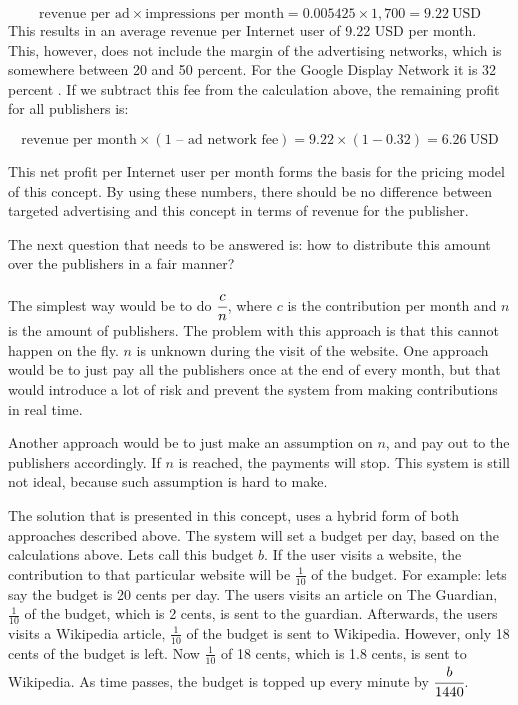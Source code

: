 \begin{equation}
  \text{revenue per ad} \times \text{impressions per month} = 0.005425 \times 1,700 = 9.22 ~\text{USD}
\end{equation}
This results in an average revenue per Internet user of 9.22 USD per month. This, however, does not include the margin of the advertising networks, which is somewhere between 20 and 50 percent. For the Google Display Network it is 32 percent \cite{googlefee}. If we subtract this fee from the calculation above, the remaining profit for all publishers is:


\begin{equation}
  \text{revenue per month} \times (\text{1 -- ad network fee}) = 9.22 \times (1 - 0.32) = 6.26 ~\text{USD}
\end{equation}


This net profit per Internet user per month forms the basis for the pricing model of this concept. By using these numbers, there should be no difference between targeted advertising and this concept in terms of revenue for the publisher.

The next question that needs to be answered is: how to distribute this amount over the publishers in a fair manner?  

The simplest way would be to do $\cfrac{c}{n}$, where $c$ is the contribution per month and $n$ is the amount of publishers. The problem with this approach is that this cannot happen on the fly. $n$ is unknown during the visit of the website. One approach would be to just pay all the publishers once at the end of every month, but that would introduce a lot of risk and prevent the system from making contributions in real time. 

Another approach would be to just make an assumption on $n$, and pay out to the publishers accordingly. If $n$ is reached, the payments will stop. This system is still not ideal, because such assumption is hard to make.

The solution that is presented in this concept, uses a hybrid form of both approaches described above. The system will set a budget per day, based on the calculations above. Lets call this budget $b$. If the user visits a website, the contribution to that particular website will be $\frac{1}{10}$ of the budget. For example: lets say the budget is 20 cents per day. The users visits an article on The Guardian, $\frac{1}{10}$ of the budget, which is 2 cents, is sent to the guardian. Afterwards, the users visits a Wikipedia article, $\frac{1}{10}$ of the budget is sent to Wikipedia. However, only 18 cents of the budget is left. Now $\frac{1}{10}$ of 18 cents, which is 1.8 cents, is sent to Wikipedia. As time passes, the budget is topped up every minute by $\cfrac{b}{1440}$.

